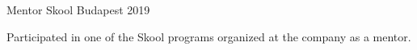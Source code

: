 

\begin{cventries}

  \cventry
    {Mentor} %
    {Skool} %
    {Budapest} %
    {2019} %
    {
      \begin{cvitems} %
        \item {Participated in one of the Skool programs organized at the company as a mentor.}
      \end{cvitems}
    }

\end{cventries}

